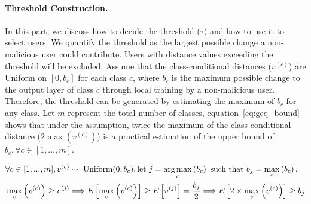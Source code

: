 \documentclass{article} %
\newcommand{\yli}[1]{{\color{cyan}#1}}
\begin{document}
\paragraph{Threshold Construction.} In this part, we discuss how to decide the threshold ($\tau$) and how to use it to select users. 
We quantify the threshold as the largest possible change a non-malicious user could contribute. Users with distance values exceeding the threshold will be excluded.
Assume that the class-conditional distances ($v^{(c)}$) are Uniform on $[0, b_c]$ for each class $c$, where $b_c$ is the maximum possible change to the output layer of class $c$ through local training by a non-malicious user. 
Therefore, the threshold can be generated by estimating the maximum of $b_c$ for any class. 
Let $m$ represent the total number of classes, equation~\ref{eq:geq_bound} shows that under the assumption, twice the maximum of the class-conditional distance ($2\max(v^{(c)})$) is a practical estimation of the upper bound of $b_c, \forall c\in [1,...,m]$.

\vspace{-0.6cm}
\begin{align}
    &\forall c \in [1,...,m], v^{(c)} \sim \textrm{ Uniform}(0, b_c), \textrm{let } j = \operatorname*{arg\,max}_c \left( b_c \right) \textrm{ such that } b_j = \max_c \left( b_c \right). \nonumber \\
    &\max_c \left( v^{(c)} \right) \geq v^{(j)} \Longrightarrow E \left[ \max_c \left( v^{(c)} \right) \right] \geq E \left[ v^{(j)} \right] = \dfrac{b_j}{2}  \Longrightarrow E \left[ 2 \times \max_c \left( v^{(c)} \right) \right] \geq b_j \label{eq:geq_bound} 
\end{align}
\end{document}
